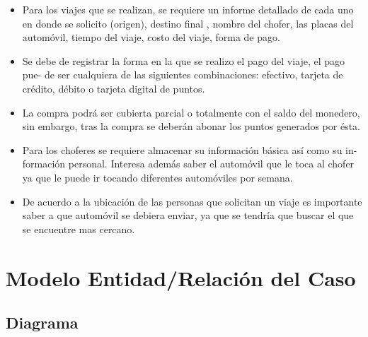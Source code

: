 \documentclass{article}
\begin{document}
{\begin{itemize}
                 \item Para los viajes que se realizan, se requiere un informe detallado de cada uno
                   en donde se solicito (origen), destino final , nombre del chofer, las placas del
                   automóvil, tiempo del viaje, costo del viaje, forma de pago.
                   
                 \item Se debe de registrar la forma en la que se realizo el pago del viaje, el pago pue-
                   de ser cualquiera de las siguientes combinaciones: efectivo, tarjeta de crédito,
                   débito o tarjeta digital de puntos.
                   
                 \item La compra podrá ser cubierta parcial o totalmente con el saldo del monedero, sin
                   embargo, tras la compra se deberán abonar los puntos generados por ésta.
                   
                 \item Para los choferes se requiere almacenar su información básica así como su in-
                   formación personal. Interesa además saber el automóvil que le toca al chofer ya
                   que le puede ir tocando diferentes automóviles por semana.
                   
                 \item De acuerdo a la ubicación de las personas que solicitan un viaje es importante
                   saber a que automóvil se debiera enviar, ya que se tendría que buscar el que se
                   encuentre mas cercano.
               \end{itemize}}
       
       \section{Modelo Entidad/Relación del Caso}

       \subsection{Diagrama}
\end{document}
